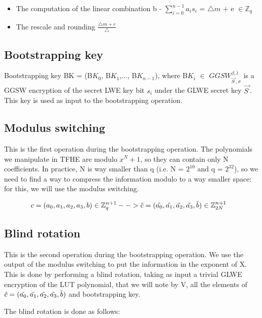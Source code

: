 \documentclass{techrep}
\theoremstyle{definition}
\theoremstyle{plain}
\newcommand{\Z}{\mathbb{Z}}
\begin{document}
\begin{itemize}
  \item The computation of the linear combination b - $\sum_{i=0}^{n-1}a_is_i$ = $\bigtriangleup m$ + e $\in \Z_q$
  \item The rescale and rounding $\frac{\bigtriangleup m + e}{\bigtriangleup}$
\end{itemize}

\subsection{Bootstrapping key}
Bootstrapping key BK = (B$K_0$, B$K_1$,..., B$K_{n-1}$), where B$K_i$ $\in$ ${GGSW}_{\overrightarrow{S^,},\sigma}^{\beta,l}$ is a GGSW encryption of the secret LWE key bit $s_i$ under the GLWE secret key $\overrightarrow{S^,}$. This key is used as input to the bootstrapping operation.

\subsection{Modulus switching}
This is the first operation during the bootstrapping operation. The polynomials we manipulate in TFHE are modulo $x^N+1$, so they can contain only N coefficients. In practice, N is way smaller than q (i.e. N = $2^{10}$ and q = $2^{32}$), so we need to find a way to compress the information modulo to a way smaller space: for this, we will use the modulus switching. 

	\begin{align*}
    c &= (a_0, a_1, a_2, a_3, b) \in \Z_q^{n+1}  --> \Tilde{c} = (\Tilde{a_0}, \Tilde{a_1}, \Tilde{a_2}, \Tilde{a_3}, \Tilde{b}) \in \Z_{2N}^{n+1} 
	\end{align*}

\subsection{Blind rotation}
This is the second operation during the bootstrapping operation. We use the output of the modulus switching to put the information in the exponent of X. This is done by performing a blind rotation, taking as input a trivial GLWE encryption of the LUT polynomial, that we will note by V, all the elements of $\Tilde{c} = (\Tilde{a_0}, \Tilde{a_1}, \Tilde{a_2}, \Tilde{a_3}, \Tilde{b})$ and bootstrapping key.

The blind rotation is done as follows:
\end{document}
